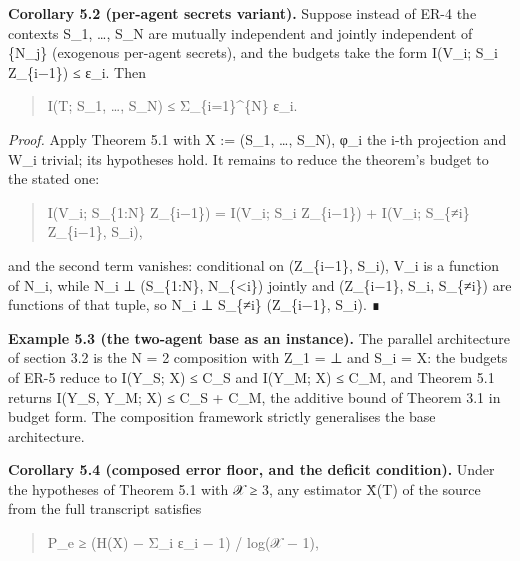 \documentclass[
  11pt,
]{article}
\begin{document}
\textbf{Corollary 5.2 (per-agent secrets variant).} Suppose instead of
ER-4 the contexts S\_1, \ldots, S\_N are mutually independent and
jointly independent of \{N\_j\} (exogenous per-agent secrets), and the
budgets take the form I(V\_i; S\_i \textbar{} Z\_\{i−1\}) ≤ ε\_i. Then

\begin{quote}
I(T; S\_1, \ldots, S\_N) ≤ Σ\_\{i=1\}\^{}\{N\} ε\_i.
\end{quote}

\emph{Proof.} Apply Theorem 5.1 with X := (S\_1, \ldots, S\_N), φ\_i the
i-th projection and W\_i trivial; its hypotheses hold. It remains to
reduce the theorem's budget to the stated one:

\begin{quote}
I(V\_i; S\_\{1:N\} \textbar{} Z\_\{i−1\}) = I(V\_i; S\_i \textbar{}
Z\_\{i−1\}) + I(V\_i; S\_\{≠i\} \textbar{} Z\_\{i−1\}, S\_i),
\end{quote}

and the second term vanishes: conditional on (Z\_\{i−1\}, S\_i), V\_i is
a function of N\_i, while N\_i ⊥ (S\_\{1:N\}, N\_\{\textless i\})
jointly and (Z\_\{i−1\}, S\_i, S\_\{≠i\}) are functions of that tuple,
so N\_i ⊥ S\_\{≠i\} \textbar{} (Z\_\{i−1\}, S\_i). ∎

\textbf{Example 5.3 (the two-agent base as an instance).} The parallel
architecture of section 3.2 is the N = 2 composition with Z\_1 = ⊥ and
S\_i = X: the budgets of ER-5 reduce to I(Y\_S; X) ≤ C\_S and I(Y\_M; X)
≤ C\_M, and Theorem 5.1 returns I(Y\_S, Y\_M; X) ≤ C\_S + C\_M, the
additive bound of Theorem 3.1 in budget form. The composition framework
strictly generalises the base architecture.

\textbf{Corollary 5.4 (composed error floor, and the deficit
condition).} Under the hypotheses of Theorem 5.1 with
\textbar 𝒳\textbar{} ≥ 3, any estimator X̂(T) of the source from the full
transcript satisfies

\begin{quote}
P\_e ≥ (H(X) − Σ\_i ε\_i − 1) / log(\textbar 𝒳\textbar{} − 1),
\end{quote}
\end{document}
